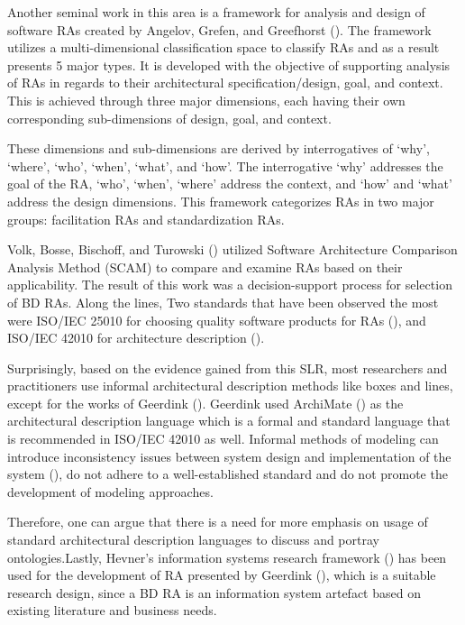 \documentclass{ieeeaccess}
\begin{document}
Another seminal work in this area is a framework for analysis and design of software RAs created by Angelov, Grefen, and Greefhorst (\cite{angelov2012framework}). The framework utilizes a multi-dimensional classification space to classify RAs and as a result presents 5 major types. It is developed with the objective of supporting analysis of RAs in regards to their architectural specification/design, goal, and context. This is achieved through three major dimensions, each having their own corresponding sub-dimensions of design, goal, and context. 

These dimensions and sub-dimensions are derived by interrogatives of ‘why’, ‘where’, ‘who’, ‘when’, ‘what’, and ‘how’. The interrogative ‘why’ addresses the goal of the RA, ‘who’, ‘when’, ‘where’ address the context, and ‘how’ and ‘what’ address the design dimensions. This framework categorizes RAs in two major groups: facilitation RAs and standardization RAs.

Volk, Bosse, Bischoff, and Turowski (\cite{volk2019decision}) utilized Software Architecture Comparison Analysis Method (SCAM) to compare and examine RAs based on their applicability. The result of this work was a decision-support process for selection of BD RAs. Along the lines, Two standards that have been observed the most were ISO/IEC 25010 for choosing quality software products for RAs (\cite{Iso}), and ISO/IEC 42010 for architecture description (\cite{ISO42010}). 

Surprisingly, based on the evidence gained from this SLR, most researchers and practitioners use informal architectural description methods like boxes and lines, except for the works of Geerdink (\cite{geerdink2013reference}). Geerdink used ArchiMate (\cite{josey2016introduction}) as the architectural description language which is a formal and standard  language that is recommended in ISO/IEC 42010 as well. Informal methods of modeling can introduce inconsistency issues between system design and implementation of the system (\cite{zhu2005software}), do not adhere to a well-established standard and do not promote the development of modeling approaches. 

Therefore, one can argue that there is a need for more emphasis on usage of standard architectural description languages to discuss and portray ontologies.Lastly, Hevner's information systems research framework (\cite{hevner2004design}) has been used for the development of RA presented by Geerdink (\cite{geerdink2013reference}), which is a suitable research design, since a BD RA is an information system artefact based on existing literature and business needs. 
\end{document}
